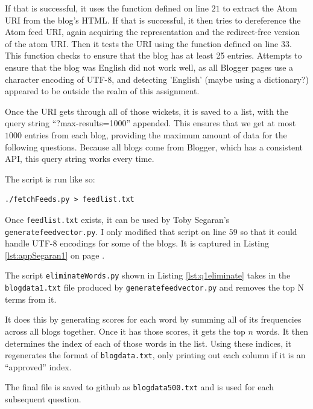 \documentclass[letterpaper,11pt]{article}
\begin{document}
If that is successful, it uses the function defined on line $21$ to extract the Atom URI from the blog's HTML.  If that is successful, it then tries to dereference the Atom feed URI, again acquiring the representation and the redirect-free version of the atom URI.  Then it tests the URI using the function defined on line $33$.  This function checks to ensure that the blog has at least 25 entries.  Attempts to ensure that the blog was English did not work well, as all Blogger pages use a character encoding of UTF-8, and detecting 'English' (maybe using a dictionary?) appeared to be outside the realm of this assignment.

Once the URI gets through all of those wickets, it is saved to a list, with the query string ``?max-results=1000'' appended.  This ensures that we get at most $1000$ entries from each blog, providing the maximum amount of data for the following questions.  Because all blogs come from Blogger, which has a consistent API, this query string works every time.



The script is run like so:
\begin{lstlisting}[frame=single]
./fetchFeeds.py > feedlist.txt
\end{lstlisting}

Once \verb+feedlist.txt+ exists, it can be used by Toby Segaran's \verb+generatefeedvector.py+\cite{pci}.  I only modified that script on line $59$ so that it could handle UTF-8 encodings for some of the blogs.  It is captured in Listing \ref{lst:appSegaran1} on page \pageref{lst:appSegaran1}.

The script \verb+eliminateWords.py+  shown in Listing \ref{lst:q1eliminate} takes in the \verb+blogdata1.txt+ file produced by \verb+generatefeedvector.py+ and removes the top N terms from it.

It does this by generating scores for each word by summing all of its frequencies across all blogs together.  Once it has those scores, it gets the top $n$ words.  It then determines the index of each of those words in the list.  Using these indices, it regenerates the format of \verb+blogdata.txt+, only printing out each column if it is an ``approved'' index.

The final file is saved to github as \verb+blogdata500.txt+ and is used for each subsequent question.
\end{document}
